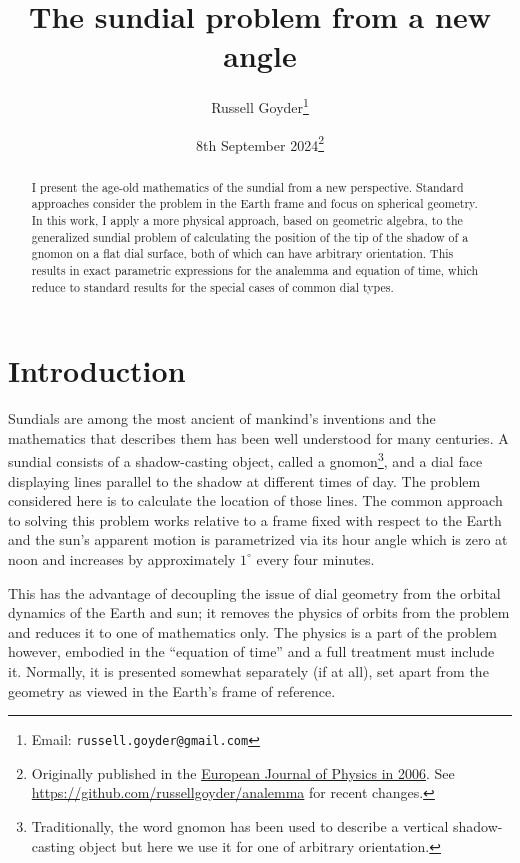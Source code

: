 \documentclass[12pt]{article}
\begin{document}
\title{The sundial problem from a new angle}
\author{Russell Goyder\footnote{Email: \texttt{russell.goyder@gmail.com}}}
\date{8th September 2024\footnote{Originally published in the \href{https://iopscience.iop.org/article/10.1088/0143-0807/27/2/023}{European Journal of Physics in 2006}. See \href{https://github.com/russellgoyder/analemma}{https://github.com/russellgoyder/analemma} for recent changes.}}
\maketitle

\begin{abstract}
  I present the age-old mathematics of the sundial from a new perspective. Standard approaches consider the problem in the Earth frame and focus on spherical geometry. In this work, I apply a more physical approach, based on geometric algebra, to the generalized sundial problem of calculating the position of the tip of the shadow of a gnomon on a flat dial surface, both of which can have arbitrary orientation. This results in exact parametric expressions for the analemma and equation of time, which reduce to standard results for the special cases of common dial types.
\end{abstract}

\section{Introduction}
%
Sundials are among the most ancient of mankind's inventions and the mathematics that describes them has been well understood for many centuries. A sundial consists of a shadow-casting object, called a gnomon\footnote{Traditionally, the word gnomon has been used to describe a vertical shadow-casting object but here we use it for one of arbitrary orientation.}, and a dial face displaying lines parallel to the shadow at different times of day. The problem considered here is to calculate the location of those lines. The common approach to solving this problem works relative to a frame fixed with respect to the Earth and the sun's apparent motion is parametrized via its hour angle which is zero at noon and increases by approximately $1^\circ$ every four minutes.

This has the advantage of decoupling the issue of dial geometry from the orbital dynamics of the Earth and sun; it removes the physics of orbits from the problem and reduces it to one of mathematics only. The physics is a part of the problem however, embodied in the ``equation of time'' and a full treatment must include it. Normally, it is presented somewhat separately (if at all), set apart from the geometry as viewed in the Earth's frame of reference.
\end{document}
